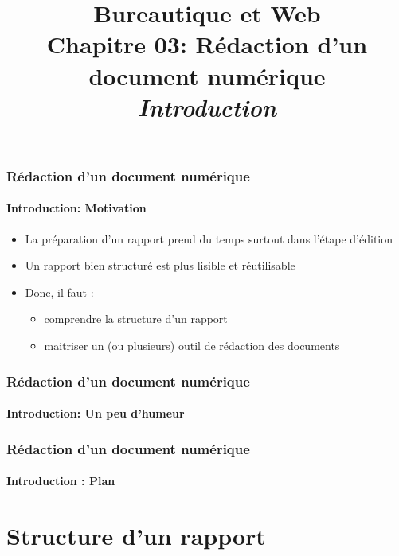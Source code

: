 \documentclass[xcolor=table]{beamer}
\title[BWEB: 03- Rédaction (Introduction)] %
{Bureautique et Web \\Chapitre 03: Rédaction d'un document numérique\\ \slshape\small  Introduction}
\begin{document}
\begin{frame}
\frametitle{Rédaction d'un document numérique}
\framesubtitle{Introduction: Motivation}

\begin{itemize}
	\item La préparation d'un rapport prend du temps surtout dans l'étape d'édition 
	\item Un rapport bien structuré est plus lisible et réutilisable 
	\item Donc, il faut :
	\begin{itemize}
		\item comprendre la structure d'un rapport 
		\item maitriser un (ou plusieurs) outil de rédaction des documents
	\end{itemize}
\end{itemize}

\end{frame}

\begin{frame}
\frametitle{Rédaction d'un document numérique}
\framesubtitle{Introduction: Un peu d'humeur}

\begin{center}
\end{center}

\end{frame}

\begin{frame}
\frametitle{Rédaction d'un document numérique}
\framesubtitle{Introduction : Plan}

\begin{multicols}{2}
	\tableofcontents
\end{multicols}
\end{frame}

\section{Structure d'un rapport}
\end{document}
